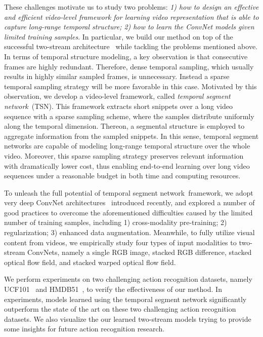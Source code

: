\documentclass[runningheads]{llncs}
\newcommand{\SEGNET}{temporal segment network}
\begin{document}
These challenges motivate us to study two problems: \emph{1) how to design an effective and efficient video-level framework for learning video representation that is able to capture long-range temporal structure; 2) how to learn the ConvNet models given limited training samples}. 
In particular, we build our method on top of the successful two-stream architecture~\cite{SimonyanZ14} while tackling the problems mentioned above.
In terms of temporal structure modeling, a key observation is that consecutive frames are highly redundant.
Therefore, dense temporal sampling, which usually results in highly similar sampled frames, is unnecessary.
Instead a sparse temporal sampling strategy will be more favorable in this case.
Motivated by this observation, we develop a video-level framework, called \emph{\SEGNET}~(TSN).
This framework extracts short snippets over a long video sequence with a sparse sampling scheme, where the samples distribute uniformly along the temporal dimension.
Thereon, a segmental structure is employed to aggregate information from the sampled snippets.
In this sense, \SEGNET s are capable of modeling long-range temporal structure over the whole video.
Moreover, this sparse sampling strategy preserves relevant information with dramatically lower cost, thus enabling end-to-end learning over long video sequences under a reasonable budget in both time and computing resources.

To unleash the full potential of \SEGNET~framework, we adopt very deep ConvNet architectures~\cite{IoffeS15,SimonyanZ14a} introduced recently, and explored a number of good practices to overcome the aforementioned difficulties caused by the limited number of training samples, including 1) cross-modality pre-training; 2) regularization; 3) enhanced data augmentation. Meanwhile, to fully utilize visual content from videos, we empirically study four types of input modalities to two-stream ConvNets, namely a single RGB image, stacked RGB difference, stacked optical flow field, and stacked warped optical flow field.
 

We perform experiments on two challenging action recognition datasets, namely UCF101~\cite{Soomro12}  and HMDB51~\cite{KuehneJGPS11}, to verify the effectiveness of our method. In experiments, models learned using the temporal segment network significantly outperform the state of the art on these two challenging action recognition datasets. We also visualize the our learned two-stream models trying to provide some insights for future action recognition research.
\end{document}
